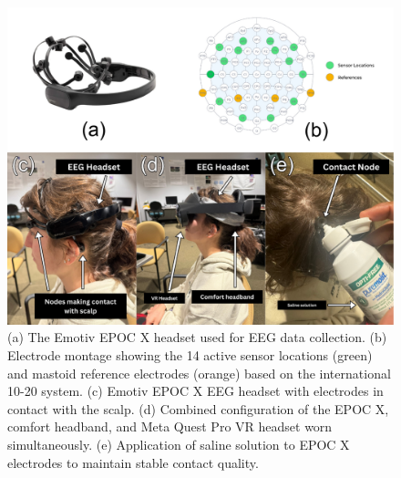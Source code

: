 \documentclass[utf8]{FrontiersinHarvard} %
\begin{document}
\begin{figure}[ht]
\begin{center}
\includegraphics[width=15cm]{figures/epocsetup.png}
\end{center}
\caption{(a) The Emotiv EPOC X headset used for EEG data collection. (b) Electrode montage showing the 14 active sensor locations (green) and mastoid reference electrodes (orange) based on the international 10-20 system. (c) Emotiv EPOC X EEG headset with electrodes in contact with the scalp. (d) Combined configuration of the EPOC X, comfort headband, and Meta Quest Pro VR headset worn simultaneously. (e) Application of saline solution to EPOC X electrodes to maintain stable contact quality.}\label{fig:epocsetup}
\end{figure}
\end{document}

